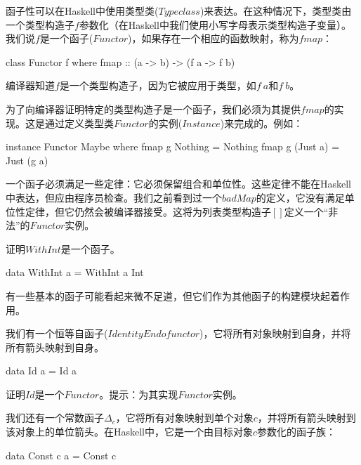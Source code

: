 \documentclass[DaoFP]{subfiles}
\begin{document}
    函子性可以在Haskell中使用类型类($Typeclass$)来表达。在这种情况下，类型类由一个类型构造子$f$参数化（在Haskell中我们使用小写字母表示类型构造子变量）。我们说$f$是一个函子($Functor$)，如果存在一个相应的函数映射，称为$fmap$：

    \begin{haskell}
        class Functor f where
        fmap :: (a -> b) -> (f a -> f b)
    \end{haskell}

    编译器知道$f$是一个类型构造子，因为它被应用于类型，如$f\ a$和$f\ b$。

    为了向编译器证明特定的类型构造子是一个函子，我们必须为其提供$fmap$的实现。这是通过定义类型类$Functor$的实例($Instance$)来完成的。例如：

    \begin{haskell}
        instance Functor Maybe where
        fmap g Nothing  = Nothing
        fmap g (Just a) = Just (g a)
    \end{haskell}

    一个函子必须满足一些定律：它必须保留组合和单位性。这些定律不能在Haskell中表达，但应由程序员检查。我们之前看到过一个$badMap$的定义，它没有满足单位性定律，但它仍然会被编译器接受。这将为列表类型构造子$[]$定义一个“非法”的$Functor$实例。

    \begin{exercise}
        证明$WithInt$是一个函子。
        \begin{haskell}
            data WithInt a = WithInt a Int
        \end{haskell}
    \end{exercise}

    有一些基本的函子可能看起来微不足道，但它们作为其他函子的构建模块起着作用。

    我们有一个恒等自函子($Identity Endofunctor$)，它将所有对象映射到自身，并将所有箭头映射到自身。

    \begin{haskell}
        data Id a = Id a
    \end{haskell}
    \begin{exercise}
        证明$Id$是一个$Functor$。提示：为其实现$Functor$实例。
    \end{exercise}

    我们还有一个常数函子$\Delta_c$，它将所有对象映射到单个对象$c$，并将所有箭头映射到该对象上的单位箭头。在Haskell中，它是一个由目标对象$c$参数化的函子族：

    \begin{haskell}
        data Const c a = Const c
    \end{haskell}
\end{document}
